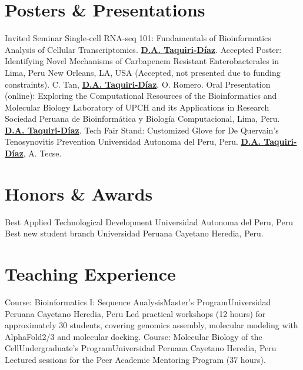\documentclass[11pt,a4paper,sans]{moderncv}
\begin{document}
\section{Posters \& Presentations}
  {{\footnotesize Invited Seminar}}
  {{\footnotesize Single-cell RNA-seq 101: Fundamentals of Bioinformatics Analysis of Cellular Transcriptomics. \textbf{\underline{D.A. Taquiri-Díaz}}.}}{}
  {}
  {{\footnotesize Accepted Poster: Identifying Novel Mechanisms of Carbapenem Resistant Enterobacterales in Lima, Peru}}
  {{\footnotesize New Orleans, LA, USA (Accepted, not presented due to funding constraints). C. Tan, \textbf{\underline{D.A. Taquiri-Díaz}}, O. Romero.}}{}
  {}
  {{\footnotesize Oral Presentation (online): Exploring the Computational Resources of the Bioinformatics and Molecular Biology Laboratory of UPCH and its Applications in Research}}
  {{\footnotesize Sociedad Peruana de Bioinformática y Biología Computacional, Lima, Peru. \textbf{\underline{D.A. Taquiri-Díaz}}.}}{}
  {}
  {{\footnotesize Tech Fair Stand: Customized Glove for De Quervain's Tenosynovitis Prevention}}
  {{\footnotesize Universidad Autonoma del Peru, Peru. \textbf{\underline{D.A. Taquiri-Díaz}}, A. Tecse.}}{}
  {}


\section{Honors \& Awards}
  {{\footnotesize Best Applied Technological Development}}
  {{\footnotesize Universidad Autonoma del Peru, Peru}}{}
  {}
  {{\footnotesize Best new student branch}}
  {{\footnotesize Universidad Peruana Cayetano Heredia, Peru.}}{}
  {}

\section{Teaching Experience}
    {Course: Bioinformatics I: Sequence Analysis}{Master’s Program}{Universidad Peruana Cayetano Heredia, Peru}
    {Led practical workshops (12 hours) for approximately 30 students, covering genomics assembly, molecular modeling with AlphaFold2/3 and molecular docking.
    }
    {Course: Molecular Biology of the Cell}{Undergraduate’s Program}{Universidad Peruana Cayetano Heredia, Peru}
    {Lectured sessions for the Peer Academic Mentoring Program (37 hours). 
    }
\end{document}
